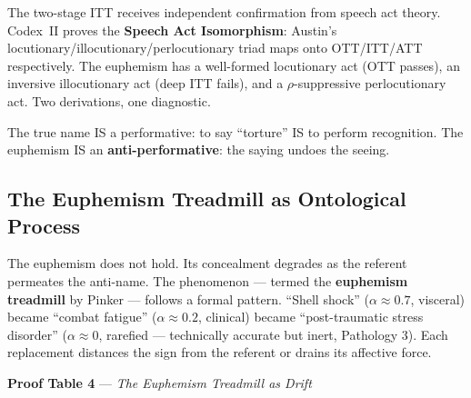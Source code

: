 \documentclass[11pt, oneside]{article}
\theoremstyle{definition}
\begin{document}
The two-stage ITT receives independent confirmation from speech act theory. Codex~II \cite{codex2} proves the \textbf{Speech Act Isomorphism}: Austin's \cite{austin} locutionary/illocutionary/perlocutionary triad maps onto OTT/ITT/ATT respectively. The euphemism has a well-formed locutionary act (OTT passes), an inversive illocutionary act (deep ITT fails), and a $\rho$-suppressive perlocutionary act. Two derivations, one diagnostic.

The true name IS a performative: to say ``torture'' IS to perform recognition. The euphemism IS an \textbf{anti-performative}: the saying undoes the seeing.

\subsection{The Euphemism Treadmill as Ontological Process}

The euphemism does not hold. Its concealment degrades as the referent permeates the anti-name. The phenomenon --- termed the \textbf{euphemism treadmill} by Pinker \cite{pinker} --- follows a formal pattern. ``Shell shock'' ($\alpha \approx 0.7$, visceral) became ``combat fatigue'' ($\alpha \approx 0.2$, clinical) became ``post-traumatic stress disorder'' ($\alpha \approx 0$, rarefied --- technically accurate but inert, Pathology 3). Each replacement distances the sign from the referent or drains its affective force.

\textbf{Proof Table 4} --- \textit{The Euphemism Treadmill as Drift}
\end{document}
